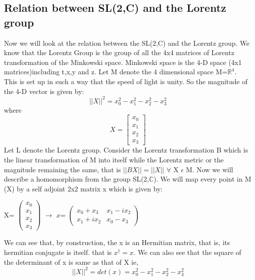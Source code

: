 \subsection{Relation between SL(2,C) and the Lorentz group}
Now we will look at the relation between the SL(2,C) and the Lorentz group. We know that the Lorentz Group is the group of all the 4x4 matrices of Lorentz transformation of the Minkowski space. Minkowski space is the 4-D space (4x1 matrices)including t,x,y and z. Let M denote the 4 dimensional space M=$\mathbb{R}^{4}$. This is set up in such a way that the speed of light is unity. So the magnitude of the 4-D vector is given by:
\begin{equation}
    ||X||^2=x_{0}^{2}-x_{1}^{2}-x_{2}^{2}-x_{3}^{2} 
\end{equation}
 where  
\begin{equation}
X=
\begin{bmatrix}
x_0 \\
x_1 \\
x_2 \\
x_3 
\end{bmatrix}
\end{equation} 
Let L denote the Lorentz group. Consider the Lorentz transformation B which is the linear transformation of M into itself while the Lorentz metric or the magnitude remaining the same, that is $||BX||=||X||$ $\forall$ X $\epsilon$ M. 
Now we will describe a homomorphism from the group SL(2,$\mathbb{C}$). We will map every point in M (X) by a self adjoint 2x2 matrix x which is given by:
\begin{center}

X=
$\begin{pmatrix}
x_0 \\
x_1 \\
x_2 \\
x_3 
\end{pmatrix}$
$\longrightarrow$
$x$=
    $\begin{pmatrix}
    x_0+x_3 & x_1-ix_2 \\
    x_1+ix_2 & x_0-x_3
    \end{pmatrix}$
\end{center}
We can see that, by construction, the x is an Hermitian matrix, that is, its hermitian conjugate is itself. that is $x^{\dagger}=x$. We can also see that the square of the determinant of x is same as that of X ie, 
\begin{equation}
  ||X||^2=det(x)=x_{0}^{2}-x_{1}^{2}-x_{2}^{2}-x_{3}^{2}   
\end{equation}
